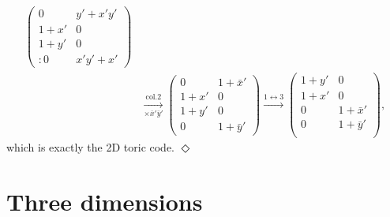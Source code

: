 \begin{example}
\begin{align*}
%
\begin{pmatrix}
0      & y'+x'y' \\
1+x'   & 0       \\
1+y' & 0       \\:
0      & x'y'+x'
\end{pmatrix}
%
\\
& \xrightarrow[\times \bar x' \bar y']{\text{col.2}}
%
\begin{pmatrix}
0      & 1 + \bar x' \\
1+x'   & 0       \\
1+y' & 0       \\
0      & 1+\bar y'
\end{pmatrix}
%
\xrightarrow{1 \leftrightarrow 3}
%
\begin{pmatrix}
1+y' & 0     \\
1+x'   & 0   \\
0      & 1+ \bar x'\\
0      & 1 + \bar y'\\
\end{pmatrix},
\end{align*}
which is exactly the 2D toric code.
\hfill $\Diamond$
\end{example} %





\section{Three dimensions}
\label{sec:3d}

